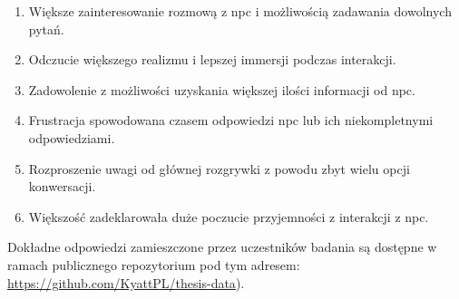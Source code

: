 \begin{enumerate}
    \item Większe zainteresowanie rozmową z \gls{npc} i możliwością zadawania dowolnych pytań.
    \item Odczucie większego realizmu i lepszej immersji podczas interakcji.
    \item Zadowolenie z możliwości uzyskania większej ilości informacji od \gls{npc}.
    \item Frustracja spowodowana czasem odpowiedzi \gls{npc} lub ich niekompletnymi odpowiedziami.
    \item Rozproszenie uwagi od głównej rozgrywki z powodu zbyt wielu opcji konwersacji.
    \item Większość zadeklarowała duże poczucie przyjemności z interakcji z \gls{npc}.
\end{enumerate}

Dokładne odpowiedzi zamieszczone przez uczestników badania są dostępne w ramach publicznego
repozytorium pod tym adresem: \href{https://github.com/KyattPL/thesis-data}{https://github.com/KyattPL/thesis-data}).